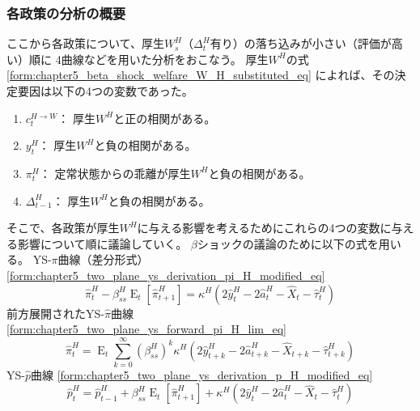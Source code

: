 \subsubsection{各政策の分析の概要}
\label{chapter5_beta_shock_policies_overview}
ここから各政策について、厚生\(W_s^H\)（\(\Delta_t^H\)有り）の落ち込みが小さい（評価が高い）順に
4曲線などを用いた分析をおこなう。
厚生\(W^H\)の式
\eqref{form:chapter5_beta_shock_welfare_W_H_substituted_eq}
によれば、その決定要因は以下の4つの変数であった。
\begin{enumerate}
    \item
    \label{itm:chapter5_beta_shock_policies_overview_c_H_W}
        \(c_t^{H \to W}\)：
        厚生\(W^H\)と正の相関がある。
    \item
    \label{itm:chapter5_beta_shock_policies_overview_y_H}
        \(y_t^H\)：
        厚生\(W^H\)と負の相関がある。
    \item
    \label{itm:chapter5_beta_shock_policies_overview_pi_H}
        \(\pi_t^H\)：
        定常状態からの乖離が厚生\(W^H\)と負の相関がある。
    \item
    \label{itm:chapter5_beta_shock_policies_overview_Delta_t_minus_1_H}
        \(\Delta_{t-1}^H\)：
        厚生\(W^H\)と負の相関がある。
\end{enumerate}
そこで、各政策が厚生\(W^H\)に与える影響を考えるためにこれらの4つの変数に与える影響について順に議論していく。
\(\beta\)ショックの議論のために以下の式を用いる。
YS-\(\pi\)曲線（差分形式）
\eqref{form:chapter5_two_plane_ys_derivation_pi_H_modified_eq}
\begin{equation}
\label{form:chapter5_beta_shock_policies_overview_ys_pi_eq}
    \hat{\pi}_t^H-\beta_{ss}^H\operatorname{E}_t[\hat{\pi}_{t+1}^H]=\kappa^H(2\hat{y}_t^H-2\hat{a}_t^H-\hat{X}_t-\hat{\tau}_t^H)
\end{equation}
前方展開されたYS-\(\hat{\pi}\)曲線
\eqref{form:chapter5_two_plane_ys_forward_pi_H_lim_eq}
\begin{equation}
\label{form:chapter5_beta_shock_policies_overview_ys_pi_H_lim_eq}
    \hat{\pi}_t^H=\operatorname{E}_t\sum_{k=0}^{\infty}(\beta_{ss}^H)^k\kappa^H(2\hat{y}_{t+k}^H-2\hat{a}_{t+k}^H-\hat{X}_{t+k}-\hat{\tau}_{t+k}^H)
\end{equation}
YS-\(\hat{p}\)曲線
\eqref{form:chapter5_two_plane_ys_derivation_p_H_modified_eq}
\begin{equation}
\label{form:chapter5_beta_shock_policies_overview_ys_p_eq}
    \hat{p}_t^H=\hat{p}_{t-1}^H+\beta_{ss}^H\operatorname{E}_t[\hat{\pi}_{t+1}^H]+\kappa^H(2\hat{y}_t^H-2\hat{a}_t^H-\hat{X}_t-\hat{\tau}_t^H)
\end{equation}
